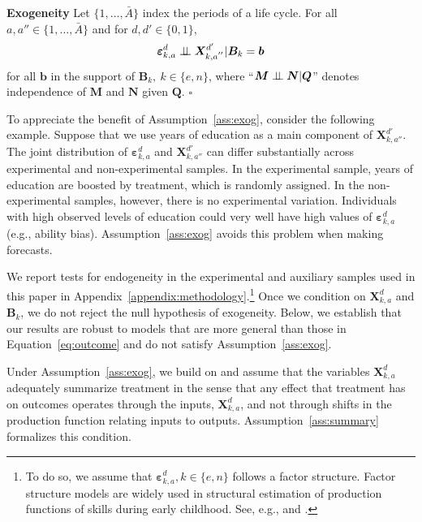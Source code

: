 \onehalfspacing
\begin{assumption}\label{ass:exog} \textbf{Exogeneity}
Let $\{ 1, \ldots, \bar{A} \}$ index the periods of a life cycle. For all $a, a'' \in \{ 1, \ldots, \bar{A} \}$ and for $d, d' \in \{0,1\}$,
\begin{equation}
\bm{\varepsilon}^d_{k,a} \perp\!\!\!\perp \bm{X}^{d^{\prime}}_{k,a^{''}} | \bm{B}_k = \bm{b}
\end{equation}
for all $\bm{b}$ in the support of $\bm{B}_k, \: k \in \{e,n\}$, where ``$\bm{M} \perp\!\!\!\perp \bm{N}|\bm{Q}$'' denotes independence of $\bm{M}$ and $\bm{N}$ given $\bm{Q}$. $\square$
\end{assumption}
\doublespacing

To appreciate the benefit of Assumption~\ref{ass:exog}, consider the following example. Suppose that we use years of education as a main component of $\bm{X}_{k,{a''}}^{d'}$. The joint distribution of $\bm{\varepsilon}_{k,a}^d$ and $\bm{X}_{k,{a''}}^{d'}$ can differ substantially across experimental and non-experimental samples. In the experimental sample, years of education are boosted by treatment, which is randomly assigned. In the non-experimental samples, however, there is no experimental variation. Individuals with high observed levels of education could very well have high values of  $\bm{\varepsilon}_{k,a}^d$ (e.g., ability bias). Assumption~\ref{ass:exog} avoids this problem when making forecasts.

We report tests for endogeneity in the experimental and auxiliary samples used in this paper in Appendix~\ref{appendix:methodology}.\footnote{To do so, we assume that $\bm{\varepsilon}_{k,a}^d, k \in \{e,n\}$ follows a factor structure. Factor structure models are widely used in structural estimation of production functions of skills during early childhood. See, e.g., \citet{Cunha_Heckman_2008_JHR} and \citet{Cunha_Heckman_etal_2010_est_tech_cognoncog}.} Once we condition on $\bm{X}_{k,a}^d$ and $\bm{B}_{k}$, we do not reject the null hypothesis of exogeneity. Below, we establish that our results are robust to models that are more general than those in Equation~\eqref{eq:outcome} and do not satisfy Assumption~\ref{ass:exog}.

Under Assumption~\ref{ass:exog}, we build on \citet{Heckman_Pinto_etal_2013_PerryFactor} and assume that the variables $\bm{X}_{k,a}^d$ adequately summarize treatment in the sense that any effect that treatment has on outcomes operates through the inputs, $\bm{X}_{k,a}^d$, and not through shifts in the production function relating inputs to outputs. Assumption~\ref{ass:summary} formalizes this condition.

